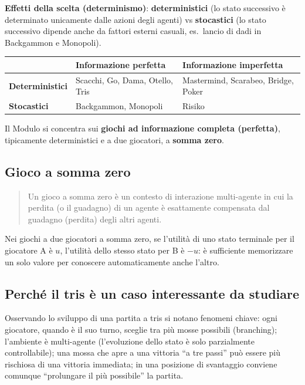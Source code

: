 \documentclass[11pt,a4paper]{report}
\begin{document}
\textbf{Effetti della scelta (determinismo)}: \textbf{deterministici} (lo stato successivo è determinato unicamente dalle azioni degli agenti) vs \textbf{stocastici} (lo stato successivo dipende anche da fattori esterni casuali, es.\ lancio di dadi in Backgammon e Monopoli).

\begin{center}
\begin{tabular}{@{}lll@{}}
\toprule
 & \textbf{Informazione perfetta} & \textbf{Informazione imperfetta} \\
\midrule
\textbf{Deterministici} & Scacchi, Go, Dama, Otello, Tris & Mastermind, Scarabeo, Bridge, Poker \\
\textbf{Stocastici} & Backgammon, Monopoli & Risiko \\
\bottomrule
\end{tabular}
\end{center}

Il Modulo si concentra sui \textbf{giochi ad informazione completa (perfetta)}, tipicamente deterministici e a due giocatori, a \textbf{somma zero}.

\subsection*{Gioco a somma zero}

\begin{quote}
Un gioco a somma zero è un contesto di interazione multi-agente in cui la perdita (o il guadagno) di un agente è esattamente compensata dal guadagno (perdita) degli altri agenti.
\end{quote}

Nei giochi a due giocatori a somma zero, se l'utilità di uno stato terminale per il giocatore A è $u$, l'utilità dello stesso stato per B è $-u$: è sufficiente memorizzare un solo valore per conoscere automaticamente anche l'altro.

\subsection*{Perché il tris è un caso interessante da studiare}

Osservando lo sviluppo di una partita a tris si notano fenomeni chiave: ogni giocatore, quando è il suo turno, sceglie tra più mosse possibili (branching); l'ambiente è multi-agente (l'evoluzione dello stato è solo parzialmente controllabile); una mossa che apre a una vittoria ``a tre passi'' può essere più rischiosa di una vittoria immediata; in una posizione di svantaggio conviene comunque ``prolungare il più possibile'' la partita.
\end{document}
